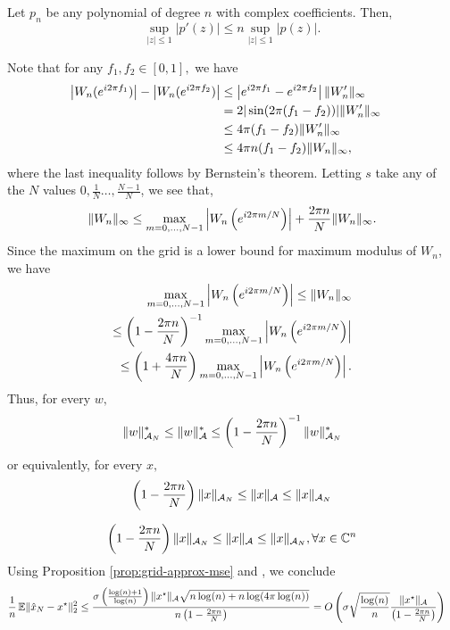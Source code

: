\begin{theorem}
Let $p_n$ be any polynomial of degree $n$ with complex coefficients. Then,
\begin{equation*}
 \sup_{|z|\leq 1} |p'(z)|  \leq n  \sup_{|z|\leq 1} |p(z)|.
\end{equation*}
\end{theorem}
Note that for any $f_1, f_2 \in [0,1],$ we have
\begin{align*}
  \left|W_n(e^{i2\pi f_1})\right| - \left|W_n(e^{i2\pi f_2})\right|  &\leq   \left|e^{i2\pi f_1} - e^{i2\pi f_2}\right| \lVert W_n'\rVert_\infty&&\\
  &= 2|\sin(2\pi (f_1-f_2))| \lVert W_n'\rVert_\infty\\
  &\leq 4 \pi (f_1-f_2) \lVert W_n'\rVert_\infty\label{diff}\\
  & \leq 4 \pi n (f_1-f_2) \lVert W_n\rVert_\infty,
\end{align*}
where the last inequality follows by Bernstein's theorem.
Letting $s$ take any of the $N$ values $0,\tfrac{1}{N} \ldots, \tfrac{N-1}{N}$, we see that,
\begin{equation*}
\lVert W_n\rVert_\infty \leq \max_{m=0,\ldots,N-1}\left| W_n\left(e^{i 2 \pi m/N}\right) \right| + \frac{2\pi n}{N}\lVert W_n\rVert_\infty.
\end{equation*}
Since the maximum on the grid is a lower bound for maximum modulus of $W_n$, we have
\begin{align}
\max_{m=0,\ldots,N-1} \left| W_n\left(e^{i 2 \pi m/N}\right) \right| \leq \lVert W_n\rVert_\infty \\
\leq  \left(1-\frac{2\pi n}{N}\right)^{-1} \max_{m=0,\ldots,N-1} \left| W_n\left(e^{i 2 \pi m/N}\right) \right|\nonumber\\
 \leq  \left(1+\frac{4\pi n}{N}\right) \max_{m=0,\ldots,N-1} \left| W_n\left(e^{i 2 \pi m/N}\right) \right|.
\label{eq:grid-approx}
\end{align}
Thus, for every $w,$
\begin{equation}
\lVert w\rVert_{\mathcal{A}_N}^* \leq  \lVert w\rVert_{\mathcal{A}}^* \leq  \left(1-\frac{2\pi n}{N}\right)^{-1} \lVert w\rVert_{\mathcal{A}_N}^*
\end{equation}
or equivalently, for every $x,$
\begin{equation}
 \left(1-\frac{2\pi n}{N}\right) \lVert x\rVert_{\mathcal{A}_N} \leq  \lVert x\rVert_{\mathcal{A}} \leq \lVert x\rVert_{\mathcal{A}_N}
\end{equation}

\begin{equation}
 \left(1-\frac{2\pi n}{N}\right) \lVert x\rVert_{\mathcal{A}_N} \leq  \lVert x\rVert_{\mathcal{A}} \leq \lVert x\rVert_{\mathcal{A}_N}, \forall x \in \mathbb{C}^n
\end{equation}
Using Proposition
\ref{prop:grid-approx-mse} and , we conclude
{\small
\begin{align*}
\frac{1}{n} \operatorname{\mathbb{E}} \lVert\hat{x}_N - x^\star\rVert_2^2 
&\leq
\frac{\sigma\left(\frac{\log(n)+1}{\log(n)}\right)\lVert x^\star\rVert_{\mathcal{A}}
\sqrt{ n \log(n) + 
    n\log(4\pi\log(n))
}}{n\left(1 - \frac{2\pi n}{N}\right)} =
O\left(
\sigma \sqrt{\frac{\log(n)}{n}} \frac{ \lVert x^\star\rVert_{\mathcal{A}}}{\left(1 - \frac{2\pi n}{N}\right)}
\right)
\end{align*}
}


